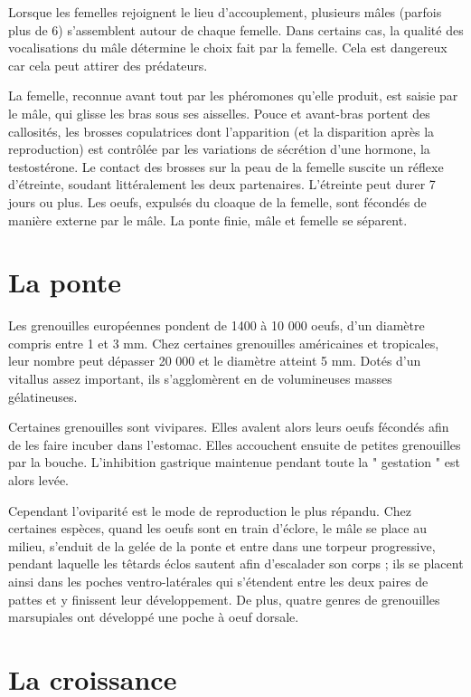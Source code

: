         Lorsque les femelles rejoignent le lieu d’accouplement, plusieurs mâles (parfois plus de 6) s’assemblent autour de chaque femelle. Dans certains cas, la qualité des vocalisations du mâle détermine le choix fait par la femelle. Cela est dangereux car cela peut attirer des prédateurs.

        La femelle, reconnue avant tout par les phéromones qu’elle produit, est saisie par le mâle, qui glisse les bras sous ses aisselles. Pouce et avant-bras portent des callosités, les brosses copulatrices dont l’apparition (et la disparition après la reproduction) est contrôlée par les variations de sécrétion d’une hormone, la testostérone. Le contact des brosses sur la peau de la femelle suscite un réflexe d’étreinte, soudant littéralement les deux partenaires. L’étreinte peut durer 7 jours ou plus. Les oeufs, expulsés du cloaque de la femelle, sont fécondés de manière externe par le mâle. La ponte finie, mâle et femelle se séparent.

 
\section{La ponte}

        Les grenouilles européennes pondent de 1400 à 10 000 oeufs, d’un diamètre compris entre 1 et 3 mm. Chez certaines grenouilles américaines et tropicales, leur nombre peut dépasser 20 000 et le diamètre atteint 5 mm. Dotés d’un vitallus assez important, ils s’agglomèrent en de volumineuses masses gélatineuses.

        Certaines grenouilles sont vivipares. Elles avalent alors leurs oeufs fécondés afin de les faire incuber dans l’estomac. Elles accouchent ensuite de petites grenouilles par la bouche. L’inhibition gastrique maintenue pendant toute la " gestation " est alors levée.

        Cependant l’oviparité est le mode de reproduction le plus répandu. Chez certaines espèces, quand les oeufs sont en train d’éclore, le mâle se place au milieu, s’enduit de la gelée de la ponte et entre dans une torpeur progressive, pendant laquelle les têtards éclos sautent afin d’escalader son corps ; ils se placent ainsi dans les poches ventro-latérales qui s’étendent entre les deux paires de pattes et y finissent leur développement. De plus, quatre genres de grenouilles marsupiales ont développé une poche à oeuf dorsale.

         

\section{La croissance}

